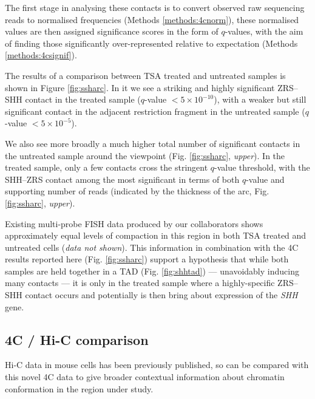 \documentclass[a4paper,10pt,oneside]{book}
\begin{document}
The first stage in analysing these contacts is to convert observed raw sequencing reads to normalised frequencies (Methods \ref{methods:4cnorm}), these normalised values are then assigned significance scores in the form of $q$-values, with the aim of finding those significantly over-represented relative to expectation (Methods \ref{methods:4csignif}).

The results of a comparison between TSA treated and untreated samples is shown in Figure \ref{fig:ssharc}. In it we see a striking and highly significant ZRS--SHH contact in the treated sample ($q$-value $ < 5 \times 10^{-10}$), with a weaker but still significant contact in the adjacent restriction fragment in the untreated sample ($q$-value $ < 5 \times 10^{-5}$). 

We also see more broadly a much higher total number of significant contacts in the untreated sample around the viewpoint (Fig. \ref{fig:ssharc}, \emph{upper}). In the treated sample, only a few contacts cross the stringent $q$-value threshold, with the SHH--ZRS contact among the most significant in terms of both $q$-value and supporting number of reads (indicated by the thickness of the arc, Fig. \ref{fig:ssharc}, \emph{upper}).

Existing multi-probe FISH data produced by our collaborators shows approximately equal levels of compaction in this region in both TSA treated and untreated cells (\emph{data not shown}). This information in combination with the 4C results reported here (Fig. \ref{fig:ssharc}) support a hypothesis that while both samples are held together in a TAD (Fig. \ref{fig:shhtad}) --- unavoidably inducing many contacts --- it is only in the treated sample where a highly-specific ZRS--SHH contact occurs and potentially is then bring about expression of the \emph{SHH} gene.


\subsection{4C / Hi-C comparison}

Hi-C data in mouse cells has been previously published,\cite{Dixon2012} so can be compared with this novel 4C data to give broader contextual information about chromatin conformation in the region under study.
\end{document}
